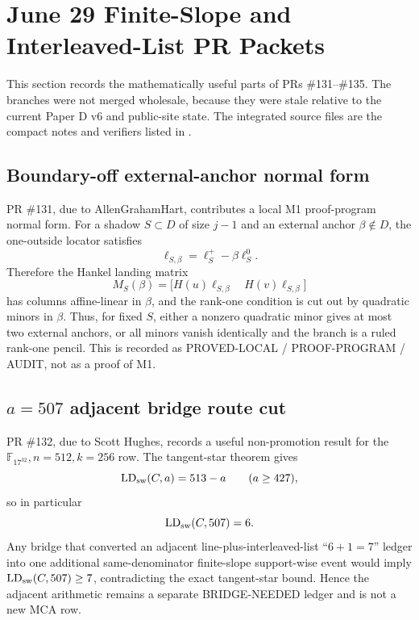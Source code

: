 \documentclass[11pt]{article}
\newcommand{\F}{\mathbb F}
\begin{document}
\section{June 29 Finite-Slope and Interleaved-List PR Packets}
\label{sec:jun29-pr-packets}

This section records the mathematically useful parts of PRs \#131--\#135.  The
branches were not merged wholesale, because they were stale relative to the
current Paper D v6 and public-site state.  The integrated source files are the
compact notes and verifiers listed in
.

\subsection{Boundary-off external-anchor normal form}

PR \#131, due to AllenGrahamHart, contributes a local M1 proof-program normal
form.  For a shadow \(S\subset D\) of size \(j-1\) and an external anchor
\(\beta\notin D\), the one-outside locator satisfies
\[
  \ell_{S,\beta}=\ell_S^+-\beta\ell_S^0 .
\]
Therefore the Hankel landing matrix
\[
  M_S(\beta)=
  \bigl[H(u)\ell_{S,\beta}\quad H(v)\ell_{S,\beta}\bigr]
\]
has columns affine-linear in \(\beta\), and the rank-one condition is cut out
by quadratic minors in \(\beta\).  Thus, for fixed \(S\), either a nonzero
quadratic minor gives at most two external anchors, or all minors vanish
identically and the branch is a ruled rank-one pencil.  This is recorded as
PROVED-LOCAL / PROOF-PROGRAM / AUDIT, not as a proof of M1.

\subsection{\(a=507\) adjacent bridge route cut}

PR \#132, due to Scott Hughes, records a useful non-promotion result for the
\(\F_{17^{32}},n=512,k=256\) row.  The tangent-star theorem gives
\[
  \operatorname{LD}_{\rm sw}(C,a)=513-a
  \qquad (a\ge427),
\]
so in particular
\[
  \operatorname{LD}_{\rm sw}(C,507)=6.
\]
Any bridge that converted an adjacent line-plus-interleaved-list
``\(6+1=7\)'' ledger into one additional same-denominator finite-slope
support-wise event would imply
\(\operatorname{LD}_{\rm sw}(C,507)\ge7\), contradicting the exact
tangent-star bound.  Hence the adjacent arithmetic remains a separate
BRIDGE-NEEDED ledger and is not a new MCA row.
\end{document}
